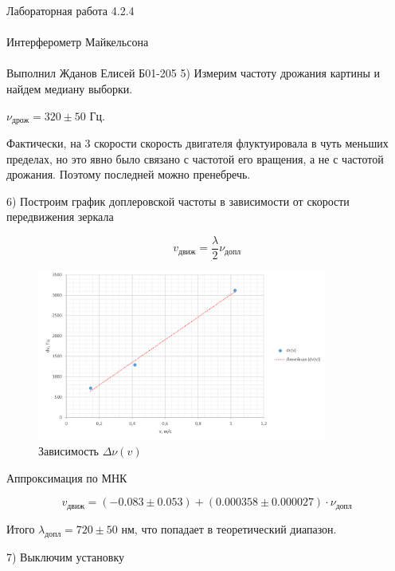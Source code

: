 \documentclass{astroedu-lab}
\begin{document}
\begin{problem}{\huge Лабораторная работа 4.2.4\\\\Интерферометр Майкельсона\\\\Выполнил Жданов Елисей Б01-205}
5) Измерим частоту дрожания картины и найдем медиану выборки.

$\nu_\text{дрож} = 320 \pm 50$ Гц.

Фактически, на 3 скорости скорость двигателя флуктуировала в чуть меньших пределах, но это явно было связано с частотой его вращения, а не с частотой дрожания. Поэтому последней можно пренебречь.

6) Построим график доплеровской частоты в зависимости от скорости
передвижения зеркала

\newpage

\begin{equation}
	v_\text{движ} = \frac{\lambda}{2} \nu_\text{допл}
\end{equation}

\begin{figure}[h]
		\begin{center}
			\includegraphics[width = 0.85\textwidth]{гр3.png}
			\caption{Зависимость $\Delta \nu(v)$}
		\end{center}
	\end{figure}
	
Аппроксимация по МНК

\begin{equation}
	v_\text{движ} = (-0.083 \pm 0.053) + (0.000358 \pm 0.000027)\cdot \nu_\text{допл}
\end{equation}

Итого $\lambda_\text{допл} = 720 \pm 50$ нм, что попадает в теоретический диапазон.

7) Выключим установку


\end{problem}
\end{document}
